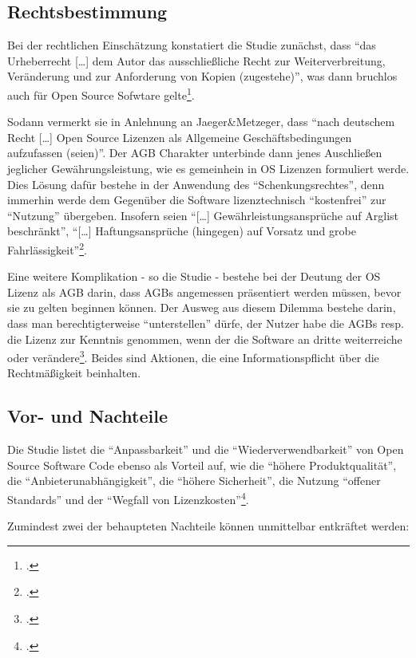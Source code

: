 \documentclass[DIV=calc,BCOR=5mm,11pt,headings=small,oneside,abstract=true, toc=bib]{scrartcl}
\begin{document}
\subsection{Rechtsbestimmung}

Bei der rechtlichen Einschätzung konstatiert die Studie zunächst, dass
\enquote{das Urheberrecht [\ldots] dem Autor das ausschließliche Recht zur
Weiterverbreitung, Veränderung und zur Anforderung von Kopien
(zugestehe)}, was dann bruchlos auch für Open Source Sofwtare
gelte\footcite[vgl.][23]{RenVetRexKet2005a}.

Sodann vermerkt sie in Anlehnung an Jaeger\&Metzeger, dass \enquote{nach
deutschem Recht [\ldots] Open Source Lizenzen als Allgemeine
Geschäftsbedingungen aufzufassen (seien)}. Der AGB Charakter
unterbinde dann jenes Auschließen jeglicher Gewährungsleistung, wie es
gemeinhein in OS Lizenzen formuliert werde. Dies Lösung dafür bestehe in der
Anwendung des \enquote{Schenkungsrechtes}, denn immerhin werde dem Gegenüber
die Software lizenztechnisch \enquote{kostenfrei} zur
\enquote{Nutzung} übergeben. Insofern seien
\enquote{[\ldots] Gewährleistungsansprüche auf Arglist beschränkt},
\enquote{[\ldots] Haftungsansprüche (hingegen) auf Vorsatz und grobe
Fahrlässigkeit}\footcite[vgl.][23]{RenVetRexKet2005a}.

Eine weitere Komplikation - so die Studie - bestehe bei der Deutung der OS
Lizenz als AGB darin, dass AGBs angemessen präsentiert werden müssen, bevor sie
zu gelten beginnen können. Der Ausweg aus diesem Dilemma bestehe darin, dass man
berechtigterweise \enquote{unterstellen} dürfe, der Nutzer habe die AGBs
resp. die Lizenz zur Kenntnis genommen, wenn der die Software an dritte
weiterreiche oder verändere\footcite[vgl.][23]{RenVetRexKet2005a}. Beides
sind Aktionen, die eine Informationspflicht über die Rechtmäßigkeit beinhalten.

\subsection{Vor- und Nachteile}
Die Studie listet die \enquote{Anpassbarkeit} und die
\enquote{Wiederverwendbarkeit} von Open Source Software Code ebenso als
Vorteil auf, wie die \enquote{höhere Produktqualität}, die
\enquote{Anbieterunabhängigkeit}, die \enquote{höhere Sicherheit}, die
Nutzung \enquote{offener Standards} und der \enquote{Wegfall von
Lizenzkosten}\footcite[vgl.][16f]{RenVetRexKet2005a}.

Zumindest zwei der behaupteten Nachteile können unmittelbar entkräftet
werden:
\end{document}
